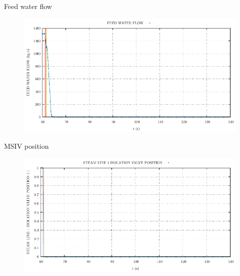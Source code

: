\begin{frame}{Feed water flow}
	\begin{figure}
		\centering
		\includegraphics[width=\textwidth]{./02SteamLineBreak/graphs/FEED WATER FLOW.pdf}
		
	\end{figure}
	
\end{frame}



%		
%	
%



\begin{frame}{MSIV position}
	\begin{figure}
		\centering
		\includegraphics[width=\textwidth]{./02SteamLineBreak/graphs/STEAM LINE 1 ISOLATION VALVE POSITION.pdf}
		
	\end{figure}
	
\end{frame}








